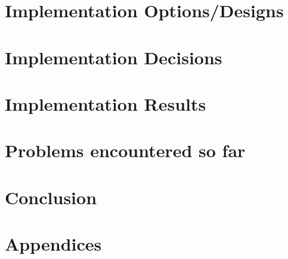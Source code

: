 \documentclass[12pt]{report}
\begin{document}
\section{Implementation Options/Designs}

\newpage

\section{Implementation Decisions}

\newpage


\section{Implementation Results}

\newpage


\section{Problems encountered so far}




\section{Conclusion}

\newpage



\section{Appendices}


\newpage
\end{document}
